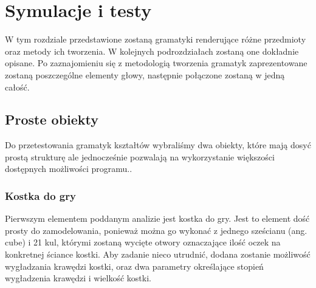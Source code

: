 \section{Symulacje i testy}
W tym rozdziale przedstawione zostaną gramatyki renderujące różne
przedmioty oraz metody ich tworzenia. W kolejnych podrozdziałach zostaną one
dokładnie opisane. Po zaznajomieniu się z metodologią tworzenia gramatyk
zaprezentowane zostaną poszczególne elementy głowy, następnie połączone zostaną
w jedną całość.

\subsection{Proste obiekty}
Do przetestowania gramatyk kształtów wybraliśmy dwa obiekty, które mają
dosyć prostą strukturę ale jednocześnie pozwalają na wykorzystanie większości
dostępnych możliwości programu..
\subsubsection{Kostka do gry}
Pierwszym elementem poddanym analizie jest kostka do gry. Jest to element dość
prosty do zamodelowania, ponieważ można go wykonać z jednego sześcianu (ang.
cube) i 21 kul, którymi zostaną wycięte otwory oznaczające ilość oczek na
konkretnej ściance kostki. Aby zadanie nieco utrudnić, dodana zostanie możliwość
wygładzania krawędzi kostki, oraz dwa parametry określające stopień wygładzenia
krawędzi i wielkość kostki.

